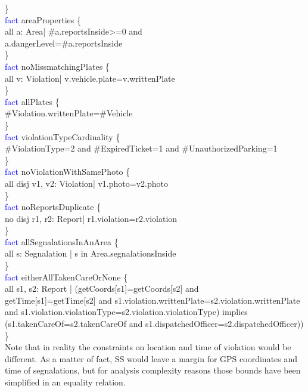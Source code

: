 \}\\
\textcolor{blue}{fact}
\textcolor{mycolor}{areaProperties} \{\\
all a: Area| \#a.reportsInside>=0 and\\ a.dangerLevel=\#a.reportsInside\\
\}\\
\textcolor{blue}{fact}
\textcolor{mycolor}{noMissmatchingPlates} \{\\
all v: Violation| v.vehicle.plate=v.writtenPlate\\
\}\\
\textcolor{blue}{fact}
\textcolor{mycolor}{allPlates} \{\\
\#Violation.writtenPlate=\#Vehicle\\
\}\\
\textcolor{blue}{fact}
\textcolor{mycolor}{violationTypeCardinality} \{\\
\#ViolationType=2 and \#ExpiredTicket=1 and \#UnauthorizedParking=1\\
\}\\
\textcolor{blue}{fact}
\textcolor{mycolor}{noViolationWithSamePhoto} \{\\
all disj v1, v2: Violation| v1.photo=v2.photo\\
\}\\
\textcolor{blue}{fact}
\textcolor{mycolor}{noReportsDuplicate} \{\\
no disj r1, r2: Report| r1.violation=r2.violation\\
\}\\
\textcolor{blue}{fact}
\textcolor{mycolor}{allSegnalationsInAnArea} \{\\
all s: Segnalation | s in Area.segnalationsInside\\
\}\\
\textcolor{blue}{fact}
\textcolor{mycolor}{eitherAllTakenCareOrNone} \{\\
all s1, s2: Report | (getCoords[s1]=getCoords[s2] and\\ getTime[s1]=getTime[s2] and s1.violation.writtenPlate=s2.violation.writtenPlate \\
and s1.violation.violationType=s2.violation.violationType) implies\\ (s1.takenCareOf=s2.takenCareOf and s1.dispatchedOfficer=s2.dispatchedOfficer))\\
\}\\
Note that in reality the constraints on location and time of violation would be different. As a matter of fact, SS would leave a margin for GPS coordinates and time of segnalations, but for analysis complexity reasons those bounds have been simplified in an equality relation.
